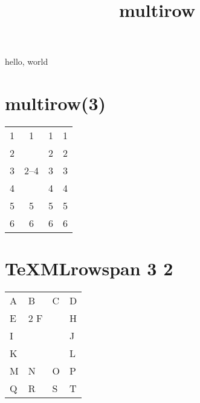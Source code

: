 \documentclass{amsart}
\title{multirow}
\begin{document}
\maketitle

hello, world

\section*{multirow(3)}

\begin{tabular}{cccc}
1 & 1                  & 1 & 1\\
2 & \multirow{3}{*}{2--4} & 2 & 2\\
3 &                    & 3 & 3\\
4 &                    & 4 & 4\\
5 & 5                  & 5 & 5\\
6 & 6                  & 6 & 6
\end{tabular}

\bigskip
\bigskip

\ifx\TeXMLrowspan\undefined\else

\section*{TeXMLrowspan 3 2}

\begin{tabular}{llll}
A &   B & C                & D\\
E &   \TeXMLrowspan 3 2 F  & & H\\
I &                        & & J \\
K &                        & & L \\
M &   N & O                & P\\
Q &   R & S                & T
\end{tabular}
\fi
\end{document}
